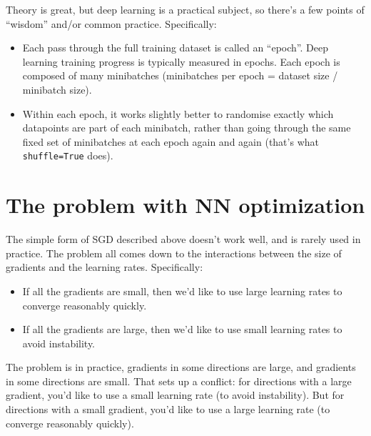 \documentclass{article}
\newcommand{\bracket}[3]{\left#1 #3 \right#2}
\newcommand{\sqb}{\bracket{[}{]}}
\newcommand{\0}{\mathbf{0}}
\newcommand{\gsfb}{g_\text{fb}}
\newcommand{\gsmb}{g_\text{mb}}
\newcommand{\E}{\operatorname{E}\sqb}
\newcommand{\Var}{\operatorname{Var}\sqb}
\begin{document}

Theory is great, but deep learning is a practical subject, so there's a few points of ``wisdom'' and/or common practice. Specifically:
\begin{itemize}
  \item Each pass through the full training dataset is called an ``epoch''.  Deep learning training progress is typically measured in epochs.  Each epoch is composed of many minibatches (minibatches per epoch = dataset size / minibatch size).
  \item Within each epoch, it works slightly better to randomise exactly which datapoints are part of each minibatch, rather than going through the same fixed set of minibatches at each epoch again and again (that's what \verb|shuffle=True| does).
\end{itemize}

\section{The problem with NN optimization}

The simple form of SGD described above doesn't work well, and is rarely used in practice.
The problem all comes down to the interactions between the size of gradients and the learning rates.
Specifically:
\begin{itemize}
  \item If all the gradients are small, then we'd like to use large learning rates to converge reasonably quickly.
  \item If all the gradients are large, then we'd like to use small learning rates to avoid instability.
\end{itemize}
The problem is in practice, gradients in some directions are large, and gradients in some directions are small.
That sets up a conflict: for directions with a large gradient, you'd like to use a small learning rate (to avoid instability).
But for directions with a small gradient, you'd like to use a large learning rate (to converge reasonably quickly).
\end{document}

